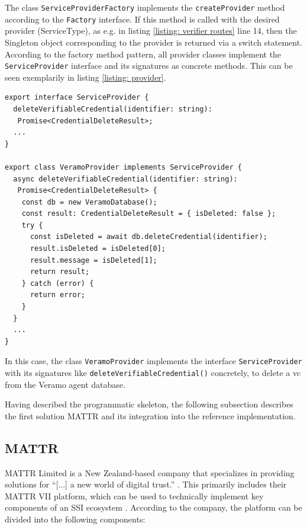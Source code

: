     The class \texttt{ServiceProviderFactory} implements the \texttt{createProvider} method according to the \texttt{Factory} interface. If this method is called with the desired provider (ServiceType), as e.g. in listing \ref{listing: verifier routes} line 14, then the Singleton object corresponding to the provider is returned via a switch statement. According to the factory method pattern, all provider classes implement the \texttt{ServiceProvider} interface and its signatures as concrete methods. This can be seen exemplarily in listing \ref{listing: provider}.
    \newline
\begin{lstlisting}[style=ES6, caption=Example of provider implementation, label={listing: provider}]
export interface ServiceProvider {
  deleteVerifiableCredential(identifier: string): 
   Promise<CredentialDeleteResult>;
  ...
}

export class VeramoProvider implements ServiceProvider {
  async deleteVerifiableCredential(identifier: string): 
   Promise<CredentialDeleteResult> {
    const db = new VeramoDatabase();
    const result: CredentialDeleteResult = { isDeleted: false };
    try {
      const isDeleted = await db.deleteCredential(identifier);
      result.isDeleted = isDeleted[0];
      result.message = isDeleted[1];
      return result;
    } catch (error) {
      return error;
    }
  }
  ...
}\end{lstlisting}

    In this case, the class \texttt{VeramoProvider} implements the interface \texttt{ServiceProvider} with its signatures like \texttt{deleteVerifiableCredential()} concretely, to delete a \ac{vc} from the Veramo agent database.
    
    Having described the programmatic skeleton, the following subsection describes the first solution MATTR and its integration into the reference implementation.
    
    \subsection{MATTR}\label{subsection: mattr}
    MATTR Limited is a New Zealand-based company \cite{mattr_privacy_2021} that specializes in providing solutions for “[...] a new world of digital trust.” \cite{mattr_mattr_2021-4}. This primarily includes their MATTR VII platform, which can be used to technically implement key components of an \ac{SSI} ecosystem \cite{mattr_products_2021}. According to the company, the platform can be divided into the following components: \cite{mattr_mattr_2021-2}

